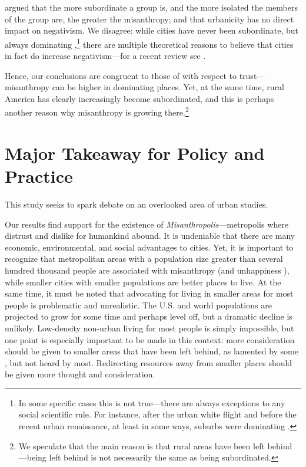 \documentclass[11pt, letterpaper]{article}
\begin{document}
\begin{spacing}{1.4}
\citet{smith97} argued that the more subordinate a group is, and the more isolated the members of the group are, the greater the misanthropy; and that urbanicity has no direct impact on negativism.  %
We disagree: while cities have never been subordinate, but always dominating \citep[e.g.,][]{aok-sizeFetish17},\footnote{In some specific cases this is not
   true---there are always exceptions to any social scientific rule. For instance, after the urban white flight and before the recent urban renaissance, at least in some ways, suburbs were dominating \citep[e.g.,][]{adams14}.} there are multiple theoretical reasons to believe that cities in fact do increase negativism---for a recent review see \citet{aokCityBook15}. 
   
Hence, our conclusions are congruent to those of \citet{schilke15} with respect to trust---misanthropy can be higher in dominating places. Yet, at the same
 time, rural America has clearly increasingly become subordinated, and this is perhaps another reason why misanthropy is growing there.\footnote{We speculate that the main reason is that rural areas have been left behind \citep{hansonCityJournalautumn15,hansonCJ17winter17,fullerNYT17monD}---being left behind is not necessarily the same as being subordinated.}  

\section*{Major Takeaway for Policy and Practice}

This study seeks to spark debate on an overlooked area of urban studies. %

Our results find  support for the existence of
\emph{Misanthropolis}---metropolis where distrust and dislike for humankind
abound. It is undeniable that there are many economic, environmental, and social
advantages to cities. Yet, it is important to recognize that metropolitan areas
with a population size greater than several hundred thousand people are
associated with misanthropy (and unhappiness \citep{aok-ls_fisher16}), while
smaller cities with smaller populations are better places to live. At the same
time, it must be noted that advocating for living in smaller areas for most people is problematic and unrealistic. The U.S. and world populations are projected to grow for some time and perhaps level off, but a dramatic decline is unlikely. Low-density non-urban living for most people is simply impossible, but one point is especially important to be made in this context: more consideration should be given to smaller areas that have been left behind, as lamented by some \citep[e.g.,][]{fullerNYT17monD,hansonCityJournalautumn15}, but not heard by most. Redirecting resources away from smaller places should be given more thought and consideration.


\end{spacing}
\end{document}
